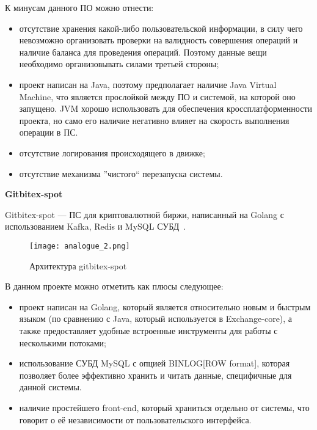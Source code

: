 К минусам данного ПО можно отнести:
\begin{itemize}
    \item отсутствие хранения какой-либо пользовательской информации, в силу чего невозможно организовать проверки на валидность совершения операций и наличие баланса для проведения операций. Поэтому данные вещи необходимо организовывать силами третьей стороны;
    \item проект написан на Java, поэтому предполагает наличие Java Virtual Machine, что является прослойкой между ПО и системой, на которой оно запущено. JVM хорошо использовать для обеспечения кроссплатформенности проекта, но само его наличие негативно влияет на скорость выполнения операции в ПС.
    \item отсутствие логирования происходящего в движке;
    \item отсутствие механизма ''чистого`` перезапуска системы.
\end{itemize}

\textbf{Gitbitex-spot}

Gitbitex-spot — ПС для криптовалютной биржи, написанный на Golang с использованием Kafka, Redis и MySQL СУБД~\cite{analogue_2}.

\begin{figure}[ht]
    \centering
	\texttt{[image: analogue\_2.png]}
	\caption{Архитектура gitbitex-spot}\label{fig:analysis:analogue_2:picture}
\end{figure}

В данном проекте можно отметить как плюсы следующее:
\begin{itemize}
    \item проект написан на Golang, который является относительно новым и быстрым языком (по сравнению с Java, который используется в Exchange-core), а также предоставляет удобные встроенные инструменты для работы с несколькими потоками;
    \item использование СУБД MySQL с опцией BINLOG[ROW format], которая позволяет более эффективно хранить и читать данные, специфичные для данной системы.
    \item наличие простейшего front-end, который храниться отдельно от системы, что говорит о её независимости от пользовательского интерфейса.
\end{itemize}

